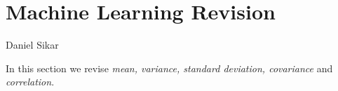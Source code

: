 \documentclass{article}
\begin{document}
\section*{Machine Learning Revision}
Daniel Sikar  

In this section we revise \textit{mean, variance, standard deviation, covariance} and \textit{correlation}.

















\end{document}
